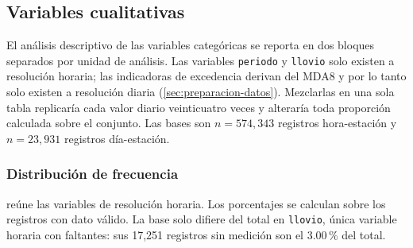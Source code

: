 \subsection{Variables cualitativas}
\label{sec:eda-cualitativas}

El análisis descriptivo de las variables categóricas se reporta en dos bloques
separados por unidad de análisis. Las variables \texttt{periodo} y
\texttt{llovio} solo existen a resolución horaria; las indicadoras de
excedencia derivan del MDA8 y por lo tanto solo existen a resolución diaria
(\cref{sec:preparacion-datos}). Mezclarlas en una sola tabla replicaría cada
valor diario veinticuatro veces y alteraría toda proporción calculada sobre el
conjunto. Las bases son $n = 574{,}343$ registros hora-estación y
$n = 23{,}931$ registros día-estación.

\subsubsection{Distribución de frecuencia}

 reúne las variables de resolución horaria. Los
porcentajes se calculan sobre los registros con dato válido. La base solo
difiere del total en \texttt{llovio}, única variable horaria con faltantes: sus
17,251 registros sin medición son el 3.00\,\% del total.


